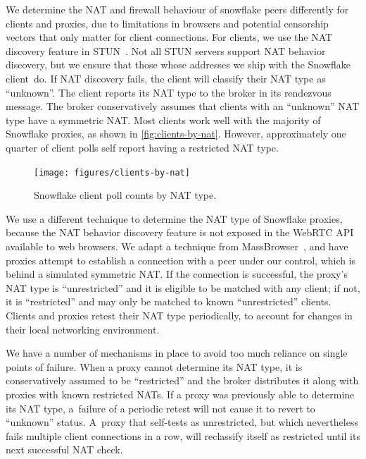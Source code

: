 \documentclass[letterpaper,twocolumn]{article}
\begin{document}
We determine the NAT and firewall behaviour of snowflake peers
differently for clients and proxies, due to
limitations in browsers and potential censorship vectors that
only matter for client connections.
For clients, we use the NAT discovery feature in STUN~\cite{rfc5780}.
Not all STUN servers support NAT behavior discovery,
but we ensure that those whose addresses we ship with the Snowflake client~do.
If NAT discovery fails, the client will classify their NAT type as ``unknown''.
The client reports its NAT type to the broker
in its rendezvous message.
The broker conservatively assumes that clients
with an ``unknown'' NAT type have a symmetric NAT.
Most clients work well with the majority of Snowflake proxies, as
shown in \autoref{fig:clients-by-nat}.
However, approximately one quarter of client polls
self report having a restricted NAT type.

\begin{figure}
\centering
\texttt{[image: figures/clients-by-nat]}
\caption{Snowflake client poll counts by NAT type.}
\label{fig:clients-by-nat}
\end{figure}

We use a different technique to determine the NAT type of Snowflake proxies,
because the NAT behavior discovery feature
is not exposed in the WebRTC API available to web browsers.
We adapt a technique from MassBrowser~\cite[\S \mbox{V-A}]{Nasr2020a},
and have proxies attempt to establish a connection with a peer under our control,
which is behind a simulated symmetric NAT.
If the connection is successful,
the proxy's NAT type is ``unrestricted''
and it is eligible to be matched with any client;
if not, it is ``restricted''
and may only be matched to known ``unrestricted'' clients.
Clients and proxies
retest their NAT type periodically, to account for changes in their local networking
environment.

We have a number of
mechanisms in place to avoid too much reliance on single points of failure.
When a proxy cannot determine its NAT type,
it is conservatively assumed to be ``restricted'' and the broker distributes it
along with proxies with known restricted NATs.
If a proxy was previously able to determine its NAT type,
a~failure of a periodic retest will not cause it to revert to ``unknown'' status.
A~proxy that self-tests as unrestricted,
but which nevertheless fails multiple client connections in a row,
will reclassify itself as restricted
until its next successful NAT check.
\end{document}
